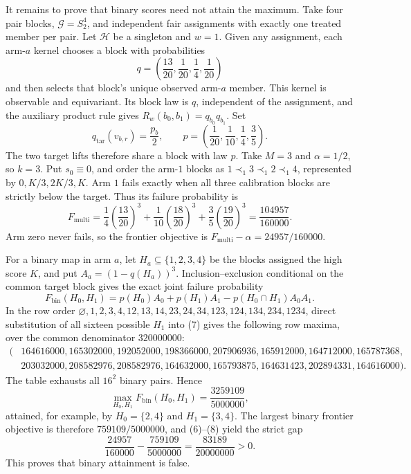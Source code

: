It remains to prove that binary scores need not attain the maximum. Take four pair blocks, \(\mathcal G=S_2^4\), and independent fair assignments with exactly one treated member per pair. Let \(\mathcal H\) be a singleton and \(w=1\). Given any assignment, each arm-\(a\) kernel chooses a block with probabilities \[q=\left(\frac{13}{20},\frac1{20},\frac14,\frac1{20}\right)\] and then selects that block's unique observed arm-\(a\) member. This kernel is observable and equivariant. Its block law is \(q\), independent of the assignment, and the auxiliary product rule gives \(R_w(b_0,b_1)=q_{b_0}q_{b_1}\). Set \[q_{\mathrm{tar}}(v_{b,r})=\frac{p_b}{2},\qquad p=\left(\frac1{20},\frac1{10},\frac14,\frac35\right).\] The two target lifts therefore share a block with law \(p\). Take \(M=3\) and \(\alpha=1/2\), so \(k=3\). Put \(s_0\equiv0\), and order the arm-\(1\) blocks as \(1\prec_1 3\prec_1 2\prec_1 4\), represented by \(0,K/3,2K/3,K\). Arm \(1\) fails exactly when all three calibration blocks are strictly below the target. Thus its failure probability is \[F_{\mathrm{multi}}=\frac14\left(\frac{13}{20}\right)^3+\frac1{10}\left(\frac{18}{20}\right)^3+\frac35\left(\frac{19}{20}\right)^3=\frac{104957}{160000}.\tag{6}\] Arm zero never fails, so the frontier objective is \(F_{\mathrm{multi}}-\alpha=24957/160000\).

For a binary map in arm \(a\), let \(H_a\subseteq\{1,2,3,4\}\) be the blocks assigned the high score \(K\), and put \(A_a=(1-q(H_a))^3\). Inclusion--exclusion conditional on the common target block gives the exact joint failure probability \[F_{\mathrm{bin}}(H_0,H_1)=p(H_0)A_0+p(H_1)A_1-p(H_0\cap H_1)A_0A_1.\tag{7}\] In the row order \(\varnothing,1,2,3,4,12,13,14,23,24,34,123,124,134,234,1234\), direct substitution of all sixteen possible \(H_1\) into (7) gives the following row maxima, over the common denominator \(320000000\): \[\begin{split}(&164616000,165302000,192052000,198366000,207906936,165912000,164712000,165787368,\\&203032000,208582976,208582976,164632000,165793875,164631423,202894331,164616000).\end{split}\tag{8}\] The table exhausts all \(16^2\) binary pairs. Hence \[\max_{H_0,H_1}F_{\mathrm{bin}}(H_0,H_1)=\frac{3259109}{5000000},\] attained, for example, by \(H_0=\{2,4\}\) and \(H_1=\{3,4\}\). The largest binary frontier objective is therefore \(759109/5000000\), and (6)--(8) yield the strict gap \[\frac{24957}{160000}-\frac{759109}{5000000}=\frac{83189}{20000000}>0.\] This proves that binary attainment is false.


